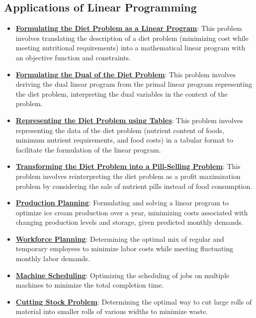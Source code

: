 \documentclass{article}%
\begin{document}
%
\subsection{Applications of Linear Programming}%
\label{subsec:ApplicationsofLinearProgramming}%
\begin{itemize}[leftmargin=*]%
\item \href{https://www.math.purdue.edu/~yipn/421/2024-09-19-DualityExamples.pdf#page=5}{\textbf{Formulating the Diet Problem as a Linear Program}}: This problem involves translating the description of a diet problem (minimizing cost while meeting nutritional requirements) into a mathematical linear program with an objective function and constraints.%
\item \href{https://www.math.purdue.edu/~yipn/421/2024-09-19-DualityExamples.pdf#page=8}{\textbf{Formulating the Dual of the Diet Problem}}: This problem involves deriving the dual linear program from the primal linear program representing the diet problem, interpreting the dual variables in the context of the problem.%
\item \href{https://www.math.purdue.edu/~yipn/421/2024-09-19-DualityExamples.pdf#page=3}{\textbf{Representing the Diet Problem using Tables}}: This problem involves representing the data of the diet problem (nutrient content of foods, minimum nutrient requirements, and food costs) in a tabular format to facilitate the formulation of the linear program.%
\item \href{https://www.math.purdue.edu/~yipn/421/2024-09-19-DualityExamples.pdf#page=7}{\textbf{Transforming the Diet Problem into a Pill-Selling Problem}}: This problem involves reinterpreting the diet problem as a profit maximization problem by considering the sale of nutrient pills instead of food consumption.%
\item \href{https://www.math.purdue.edu/~yipn/421/2024-10-28-ApplsLinProg.pdf#page=3}{\textbf{Production Planning}}: Formulating and solving a linear program to optimize ice cream production over a year, minimizing costs associated with changing production levels and storage, given predicted monthly demands.%
\item \href{https://www.math.purdue.edu/~yipn/421/2024-10-28-ApplsLinProg.pdf#page=7}{\textbf{Workforce Planning}}: Determining the optimal mix of regular and temporary employees to minimize labor costs while meeting fluctuating monthly labor demands.%
\item \href{https://www.math.purdue.edu/~yipn/421/2024-10-28-ApplsLinProg.pdf#page=22}{\textbf{Machine Scheduling}}: Optimizing the scheduling of jobs on multiple machines to minimize the total completion time.%
\item \href{https://www.math.purdue.edu/~yipn/421/2024-10-28-ApplsLinProg.pdf#page=25}{\textbf{Cutting Stock Problem}}: Determining the optimal way to cut large rolls of material into smaller rolls of various widths to minimize waste.%
\end{itemize}
\end{document}
